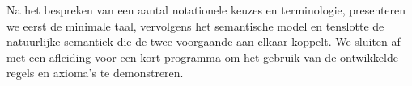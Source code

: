 Na het bespreken van een aantal notationele keuzes en terminologie, presenteren we eerst de minimale taal, vervolgens het semantische model en tenslotte de natuurlijke semantiek die de twee voorgaande aan elkaar koppelt. We sluiten af met een afleiding voor een kort programma om het gebruik van de ontwikkelde regels en axioma's te demonstreren.

